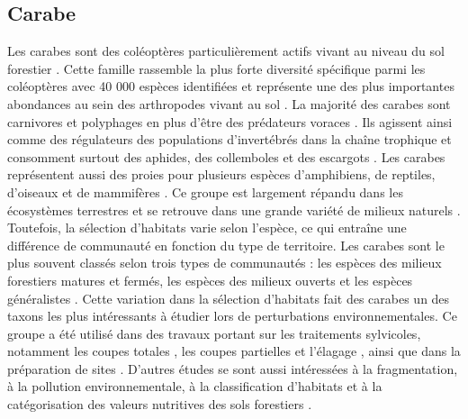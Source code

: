 \subsection*{Carabe}

Les carabes sont des coléoptères particulièrement actifs vivant au niveau du sol forestier \citep{loveiEcologyBehaviorGround1996,Rochefort2006GroundBeetle}.
Cette famille rassemble la plus forte diversité spécifique parmi les coléoptères avec 40 000 espèces identifiées \citep{Erwin1985taxonpulse} 
et représente une des plus importantes abondances au sein des arthropodes vivant au sol \citep{loveiEcologyBehaviorGround1996,Rochefort2006GroundBeetle}.
La majorité des carabes sont carnivores et polyphages en plus d’être des prédateurs voraces \citep{loveiEcologyBehaviorGround1996}. 
Ils agissent ainsi comme des régulateurs des populations d’invertébrés dans la chaîne trophique et consomment surtout des aphides, des collemboles et des escargots \citep{loveiEcologyBehaviorGround1996}. 
Les carabes représentent aussi des proies pour plusieurs espèces d’amphibiens, de reptiles, d’oiseaux et de mammifères \citep{loveiEcologyBehaviorGround1996}. 
Ce groupe est largement répandu dans les écosystèmes terrestres et se retrouve dans une grande variété de milieux naturels \citep{Larochelle2003naturalhistory}. 
Toutefois, la sélection d'habitats varie selon l'espèce, ce qui entraîne une différence de communauté en fonction du type de territoire.
Les carabes sont le plus souvent classés selon trois types de communautés : les espèces des milieux forestiers matures et fermés, les espèces des milieux ouverts et les espèces généralistes \citep{Niemela2007effectsforestry}. 
Cette variation dans la sélection d'habitats fait des carabes un des taxons les plus intéressants à étudier lors de perturbations environnementales.
Ce groupe a été utilisé dans des travaux portant sur les traitements sylvicoles, notamment les coupes totales \citep{Heliola2001Distributioncarabid,koivulaBorealCarabidbeetleColeoptera2002a,Niemela1993Effectsclearcut}, 
les coupes partielles et l'élagage \citep{Lemieux2004Groundbeetle,Peck2004Longertermeffects,mooreEffectsTwoSilvicultural2004}, 
ainsi que dans la préparation de sites \citep{Duchesne*1999EffectsClearCutting}.
D'autres études se sont aussi intéressées à la fragmentation, à la pollution environnementale, à la classification d'habitats et à la catégorisation des valeurs nutritives des sols forestiers \citep{bouchardBeetleCommunityResponse2016b,Halme1993Carabidbeetles,Luff1992Classificationprediction,Niemela2001Carabidbeetles,Rainio2003Groundbeetles,Work2008Evaluationcarabid}.

